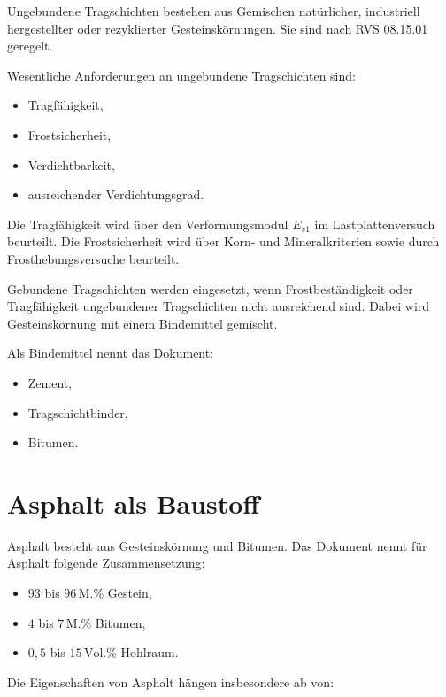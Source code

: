 \documentclass[
  12pt,
  a4paper,
  oneside
]{scrreprt}
\begin{document}
Ungebundene Tragschichten bestehen aus Gemischen natürlicher,
industriell hergestellter oder rezyklierter Gesteinskörnungen. Sie sind
nach RVS 08.15.01 geregelt.


Wesentliche Anforderungen an ungebundene Tragschichten sind:

\begin{itemize}
  \item Tragfähigkeit,
  \item Frostsicherheit,
  \item Verdichtbarkeit,
  \item ausreichender Verdichtungsgrad.
\end{itemize}



Die Tragfähigkeit wird über den Verformungsmodul $E_{v1}$ im
Lastplattenversuch beurteilt. Die Frostsicherheit wird über Korn- und
Mineralkriterien sowie durch Frosthebungsversuche beurteilt.


Gebundene Tragschichten werden eingesetzt, wenn Frostbeständigkeit oder
Tragfähigkeit ungebundener Tragschichten nicht ausreichend sind. Dabei
wird Gesteinskörnung mit einem Bindemittel gemischt.


Als Bindemittel nennt das Dokument:

\begin{itemize}
  \item Zement,
  \item Tragschichtbinder,
  \item Bitumen.
\end{itemize}



\section{Asphalt als Baustoff}

Asphalt besteht aus Gesteinskörnung und Bitumen. Das Dokument nennt für
Asphalt folgende Zusammensetzung:

\begin{itemize}
  \item $93$ bis $96\,\mathrm{M.\%}$ Gestein,
  \item $4$ bis $7\,\mathrm{M.\%}$ Bitumen,
  \item $0{,}5$ bis $15\,\mathrm{Vol.\%}$ Hohlraum.
\end{itemize}



Die Eigenschaften von Asphalt hängen insbesondere ab von:
\end{document}

